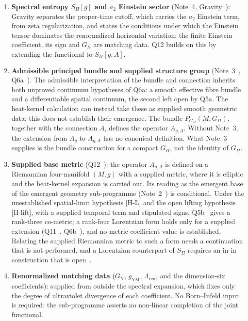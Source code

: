 \documentclass[11pt,a4paper]{article}
\theoremstyle{definition}
\newcommand{\GN}{G_{\mathrm{N}}}
\newcommand{\gYM}{g_{\mathrm{YM}}}
\newcommand{\SPI}{S_\Pi}
\newcommand{\Gpi}{G_\Pi}
\begin{document}
    \begin{enumerate}
      \item \textbf{Spectral entropy $\SPI[g]$ and $a_2$ Einstein sector}
      (Note~4, Gravity~\cite{Beau2026h}):
      Gravity separates the proper-time cutoff, which carries the $a_2$ Einstein term, from zeta
      regularization, and states the conditions under which the Einstein tensor dominates the renormalized
      horizontal variation; the finite Einstein coefficient, its sign and $\GN$ are matching data.
      Q12 builds on this by extending the functional to $\SPI[g,A]$.

      \item \textbf{Admissible principal bundle and supplied structure group}
      (Note~3~\cite{Beau2026gsnote}, Q6a~\cite{Beau2026q6a}).
      The admissible interpretation of the bundle and connection inherits both unproved continuum
      hypotheses of Q6a: a smooth effective fibre bundle and a differentiable spatial continuum,
      the second left open by Q5a.
      The heat-kernel calculation can instead take these as supplied smooth geometric data; this
      does not establish their emergence.
      The bundle $P_{\Gpi}(M,\Gpi)$, together with the connection $A$, defines the
      operator $A_{g,A}$.
      Without Note~3, the extension from $A_g$ to $A_{g,A}$ has no canonical definition.
      What Note~3 supplies is the bundle construction for a compact $\Gpi$, not the identity of
      $\Gpi$.

      \item \textbf{Supplied base metric} (Q12~\cite{Beau2026q12}):
      the operator $A_{g,A}$ is defined on a Riemannian four-manifold $(M,g)$ with a supplied metric, where it is
      elliptic and the heat-kernel expansion is carried out.
      Its reading as the emergent base of the emergent geometry sub-programme (Note~2~\cite{Beau2026egnote}) is
      conditional.
      Under the unestablished spatial-limit hypothesis [H-L] and the open lifting hypothesis [H-lift], with a
      supplied temporal term and stipulated signs, Q5b~\cite{Beau2026q5b} gives a rank-three co-metric; a rank-four
      Lorentzian form holds only for a supplied extension
      (Q11~\cite{Beau2026q11}, Q6b~\cite{Beau2026q6b}), and no metric coefficient value is established.
      Relating the supplied Riemannian metric to such a form needs a continuation that is not performed, and a
      Lorentzian counterpart of $\SPI$ requires an in-in construction that is open~\cite{Beau2026i}.

      \item \textbf{Renormalized matching data} ($\GN$, $\gYM$, $\Lambda_{\mathrm{ren}}$, and the
      dimension-six coefficients): supplied from outside the spectral expansion, which fixes only
      the degree of ultraviolet divergence of each coefficient.
      No Born--Infeld input is required: the sub-programme asserts no non-linear completion of the
      joint functional.
    \end{enumerate}
\end{document}
